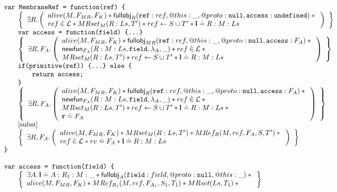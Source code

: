 \documentclass[a4paper,notitlepage]{report}
\begin{document}
\begin{figure}
  \[
    \begin{array}{l}
      \tjs{var MembraneRef = function(ref) \{} \\
        \indblock{
          \logic{
            \exists R \st \args{
              alive(M, F_{MR}, F_K) \sep  \fullobj_{R}(\js{ref}: ref, @this: \_, @proto: \nil, \js{access}:
                \und) \sep {} \\
              ref \dotin \loc \sep
              MRset_M(R:Ls,T') \sep ref \bp S \cup T' \sep \ls \doteq R:M:Ls
            }
          } \\
          \tjs{var access = function(field) \{...\}} \\
          \logic{
            \exists R,F_A \st \args{
              alive(M, F_{MR}, F_K) \sep \fullobj_{MR}(\js{ref}: ref, @this: \_, @proto: \nil, \js{access}:
                F_A) \sep {} \\
              \newfun_{F_A}(R:M:Ls, \js{field}, \lambda_A, \_) \sep ref \dotin
              \loc \sep {} \\
              MRset_M(R:Ls,T') \sep ref \bp S \cup T' \sep \ls \doteq R:M:Ls
            }
          } \\
          \tjs{if(primitive(ref)) \{...\} else \{} \\
            \indblock{
              \tjs{return access;} \\
            }
          \tjs{\}} \\
          \logic{
            \exists R,F_A \st \args{
              alive(M, F_{MR}, F_K) \sep \fullobj_{R}(\js{ref}: ref, @this: \_, @proto: \nil, \js{access}:
                F_A) \sep {} \\
              \newfun_{F_A}(R:M:Ls, \js{field}, \lambda_A, \_) \sep ref \dotin
              \loc \sep {} \\
              MRset_M(R:Ls,T') \sep ref \bp S \cup T' \sep \ls \doteq R:M:Ls
                \sep {} \\
              \rv \doteq F_A
            }
          } \\
          \step{subst} \\
          \logic{
            \exists R,F_A \st \args{
              alive(M, F_{MR}, F_K) \sep MRset_M(R:Ls,T') \sep MRef_{R}(M,ref,F_A,S,T') \sep
                {} \\
              ref \dotin \loc \sep rv \doteq F_A \sep \ls \doteq R:M:Ls
            }
          }
        }
      \tjs{\}} \\
      \\
      \tjs{var access = function(field) \{} \\
        \indblock{
          \logic{
            \exists A \st \ls \doteq A : R_1 : M : \_ \sep
            \fullobj_A(\js{field}: field, @proto:\nil, @this:\_) \sep {} \\
            alive(M, F_{MR}, F_K) \sep
            MRef_{R_1}(M,ref,F_{A_1},S_1,T_1) \sep
            MRset(Ls,T_1) \sep {} \\

}}
\end{array}\]
\end{figure}
\end{document}
